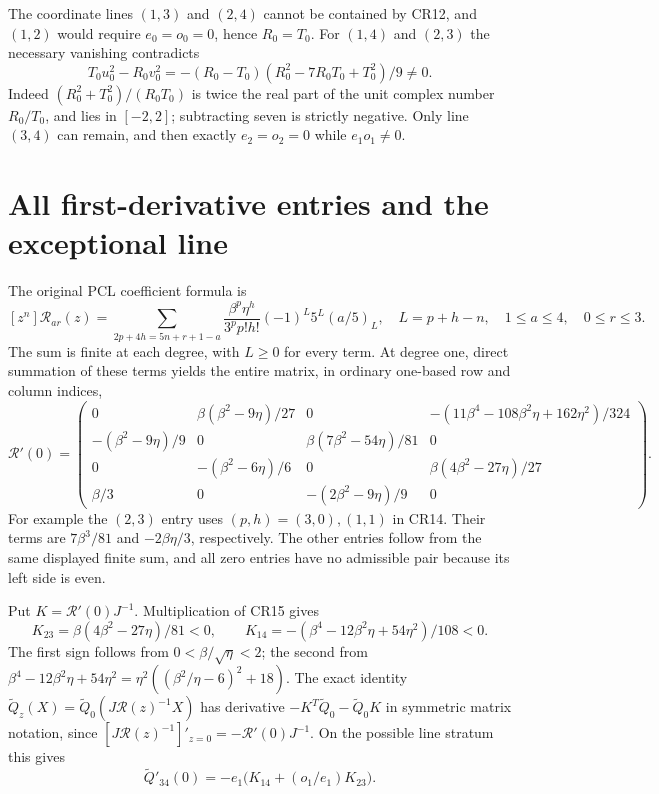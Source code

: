 The coordinate lines $(1,3)$ and $(2,4)$ cannot be contained by
CR12, and $(1,2)$ would require $e_0=o_0=0$, hence $R_0=T_0$.
For $(1,4)$ and $(2,3)$ the necessary vanishing contradicts
\[
 T_0u_0^2-R_0v_0^2
  =-(R_0-T_0)(R_0^2-7R_0T_0+T_0^2)/9\ne0.                     \tag{CR13}
\]
Indeed $(R_0^2+T_0^2)/(R_0T_0)$ is twice the real part of the
unit complex number $R_0/T_0$, and lies in $[-2,2]$; subtracting
seven is strictly negative.  Only line $(3,4)$ can remain, and
then exactly $e_2=o_2=0$ while $e_1o_1\ne0$.

\section{All first-derivative entries and the exceptional line}
The original PCL coefficient formula is
\[
 [z^n]\mathcal R_{ar}(z)=
 \sum_{2p+4h=5n+r+1-a}
 \frac{\beta^p\eta^h}{3^p p!h!}(-1)^L5^L(a/5)_L,
 \quad L=p+h-n,\quad 1\le a\le4,\quad0\le r\le3.              \tag{CR14}
\]
The sum is finite at each degree, with $L\ge0$ for every term.
At degree one, direct summation of these terms yields the entire
matrix, in ordinary one-based row and column indices,
\[
 \mathcal R'(0)=
 \begin{pmatrix}
 0&\beta(\beta^2-9\eta)/27&0&
          -(11\beta^4-108\beta^2\eta+162\eta^2)/324\\
 -(\beta^2-9\eta)/9&0&\beta(7\beta^2-54\eta)/81&0\\
 0&-(\beta^2-6\eta)/6&0&\beta(4\beta^2-27\eta)/27\\
 \beta/3&0&-(2\beta^2-9\eta)/9&0
 \end{pmatrix}.                                                   \tag{CR15}
\]
For example the $(2,3)$ entry uses $(p,h)=(3,0),(1,1)$
in CR14.  Their terms are $7\beta^3/81$ and
$-2\beta\eta/3$, respectively.  The other entries follow from
the same displayed finite sum, and all zero entries have no
admissible pair because its left side is even.

Put $K=\mathcal R'(0)J^{-1}$.  Multiplication of CR15 gives
\[
 K_{23}=\beta(4\beta^2-27\eta)/81<0,\qquad
 K_{14}=-(\beta^4-12\beta^2\eta+54\eta^2)/108<0.                 \tag{CR16}
\]
The first sign follows from $0<\beta/\sqrt\eta<2$; the second
from $\beta^4-12\beta^2\eta+54\eta^2
=\eta^2((\beta^2/\eta-6)^2+18)$.
The exact identity
$\widetilde Q_z(X)=\widetilde Q_0(J\mathcal R(z)^{-1}X)$ has
derivative $-K^T\widetilde Q_0-\widetilde Q_0K$ in symmetric
matrix notation, since
$[J\mathcal R(z)^{-1}]'_{z=0}=-\mathcal R'(0)J^{-1}$.
On the possible line stratum this gives
\[
 \widetilde Q'_{34}(0)
       =-e_1\bigl(K_{14}+(o_1/e_1)K_{23}\bigr).                  \tag{CR17}
\]

